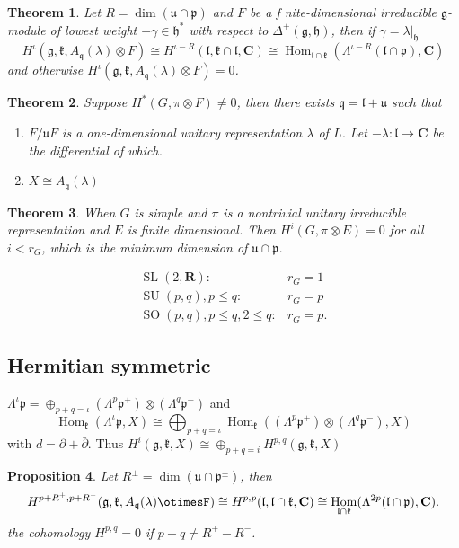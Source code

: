 \documentclass[leqno]{amsart}
\DeclareMathOperator{\SL}{SL}
\DeclareMathOperator{\SU}{SU}
\DeclareMathOperator{\SO}{SO}
\newcommand{\R}{\mathbf R}
\newcommand{\C}{\mathbf C}
\newcommand{\1}{\mathbf{1}}
\newcommand{\cfg}{\mathfrak{g}}
\newcommand{\cfh}{\mathfrak{h}}
\newcommand{\cfk}{\mathfrak{k}}
\newcommand{\cfp}{\mathfrak{p}}
\newcommand{\cfq}{\mathfrak{q}}
\newcommand{\cfu}{\mathfrak{u}}
\newcommand{\cfl}{\mathfrak{l}}
\DeclareMathOperator{\Hom}{Hom}
\newtheorem{thm}{Theorem}[section]
\newtheorem{prop}[thm]{Proposition}
\theoremstyle{definition}
\theoremstyle{remark}
\begin{document}
\begin{thm}
	Let $R=\dim(\cfu\cap\cfp)$
	and $F$ be a f nite-dimensional irreducible $\cfg$-module
	of lowest weight $-\gamma\in \cfh^*$
	with respect to  $\Delta^+(\cfg,\cfh)$,
	then if $\gamma=\lambda\vert_{\cfh}$
	\[
		H^\iota(\cfg,\cfk,A_\cfq(\lambda)\otimes F)\cong
		H^{\iota-R}(\cfl,\cfk\cap\cfl,\C)\cong
		\Hom_{\cfl\cap\cfk}
		(\Lambda^{\iota-R}(\cfl\cap\cfp), \C)
	\]
	and otherwise
	$H^\iota(\cfg,\cfk,A_\cfq(\lambda)\otimes F)=0$.
\end{thm}

\begin{thm}
	Suppose $H^*(G,\pi\otimes F)\neq 0$,
	then there exists  $\cfq=\cfl+\cfu$ such that
	 \begin{enumerate}[label=(\alph*)]
		\item $F/\cfu F$ is a one-dimensional 
			unitary representation $\lambda$ of $L$.
			Let $-\lambda\colon \cfl\to \C$
			be the differential of which.
		\item  $X\cong A_\cfq(\lambda)$
	\end{enumerate}
\end{thm}

\begin{thm}
	When $G$ is simple and  $\pi$ is a nontrivial
	unitary irreducible representation
	and  $E$ is finite dimensional.
	Then  $H^i(G,\pi\otimes E)=0$ 
	for all $i<r_G$, which is the minimum dimension
	of  $\cfu\cap \cfp$.
\end{thm}
\begin{align*}
	\SL(2,\R)\colon & r_G=1\\
	\SU(p,q),p\leq q\colon& r_G=p\\
	\SO(p,q),p\leq q,2\leq q\colon& r_G=p.
\end{align*}

\subsection{Hermitian symmetric}

$\Lambda^\iota\cfp=\oplus_{p+q=\iota}(\Lambda^p\cfp^+)
\otimes(\Lambda^q\cfp^-)$ and
\[
	\Hom_\cfk(\Lambda^\iota\cfp,X)\cong
	\bigoplus_{p+q=\iota}
	\Hom_\cfk((\Lambda^p\cfp^+) \otimes(\Lambda^q\cfp^-),X)
\]
with $d=\partial+\bar{\partial}$.
Thus 
$H^i(\cfg,\cfk,X)\cong \oplus_{p+q=i}H^{p,q}(\cfg,\cfk,X)$

\begin{prop}
	Let $R^{\pm}=\dim(\cfu\cap\cfp^\pm)$, 
	then
	\[
		H^{p+R^+,p+R^-}(\cfg,\cfk,A_\cfq(\lambda)\otimesF)
		\cong H^{p,p}(\cfl,\cfl\cap\cfk,\C)
		\cong \Hom_{\cfl\cap\cfk}
		(\Lambda^{2p}(\cfl\cap\cfp),\C).
	\]
	the cohomology $H^{p,q}=0$ 
	if $p-q\neq R^+-R^-$.
\end{prop}


\end{document}
